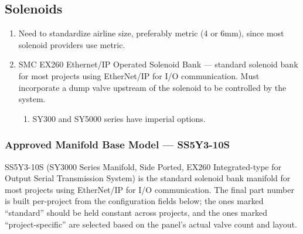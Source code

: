 \subsection{Solenoids}
\begin{enumerate}[itemsep=2pt]
  \item Need to standardize airline size, preferably metric (4 or 6mm), since most solenoid providers use metric.
  \item SMC EX260 Ethernet/IP Operated Solenoid Bank --- standard solenoid bank for most projects using EtherNet/IP for I/O communication. Must incorporate a dump valve upstream of the solenoid to be controlled by the system.
  \begin{enumerate}
    \item SY300 and SY5000 series have imperial options.
  \end{enumerate}
\end{enumerate}

\subsubsection*{Approved Manifold Base Model --- SS5Y3-10S}
SS5Y3-10S (SY3000 Series Manifold, Side Ported, EX260 Integrated-type for Output Serial Transmission System) is the standard solenoid bank manifold for most projects using EtherNet/IP for I/O communication. The final part number is built per-project from the configuration fields below; the ones marked ``standard'' should be held constant across projects, and the ones marked ``project-specific'' are selected based on the panel's actual valve count and layout.

